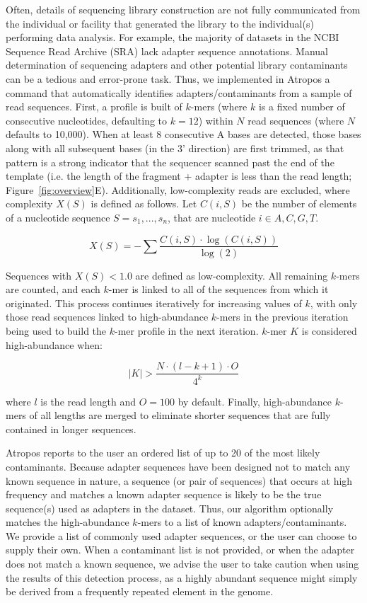 \documentclass[fleqn,10pt,lineno]{wlpeerj} %
\begin{document}
Often, details of sequencing library construction are not fully communicated from the individual or facility that generated the library to the individual(s) performing data analysis. For example, the majority of datasets in the NCBI Sequence Read Archive (SRA) lack adapter sequence annotations. Manual determination of sequencing adapters and other potential library contaminants can be a tedious and error-prone task. Thus, we implemented in Atropos a command that automatically identifies adapters/contaminants from a sample of read sequences. First, a profile is built of $k$-mers (where $k$ is a fixed number of consecutive nucleotides, defaulting to $k=12$) within $N$ read sequences (where $N$ defaults to 10,000). When at least 8 consecutive A bases are detected, those bases along with all subsequent bases (in the 3' direction) are first trimmed, as that pattern is a strong indicator that the sequencer scanned past the end of the template (i.e. the length of the fragment + adapter is less than the read length; Figure~\ref{fig:overview}E). Additionally, low-complexity reads are excluded, where complexity $X(S)$ is defined as follows. Let $C(i,S)$ be the number of elements of a nucleotide sequence $S = s_{1}, ..., s_{n}$, that are nucleotide $i \in {A,C,G,T}$.

\begin{equation}
X(S) = -\sum \frac{C(i,S) \cdot \log(C(i,S))}{\log(2)}
\label{eq:complexity}
\end{equation}

Sequences with $X(S) < 1.0$ are defined as low-complexity. All remaining $k$-mers are counted, and each $k$-mer is linked to all of the sequences from which it originated. This process continues iteratively for increasing values of $k$, with only those read sequences linked to high-abundance $k$-mers in the previous iteration being used to build the $k$-mer profile in the next iteration. $k$-mer $K$ is considered high-abundance when:

\begin{equation}
|K| > \frac{N \cdot (l - k + 1) \cdot O}{4^k}
\label{eq:abundance}
\end{equation}

where $l$ is the read length and $O=100$ by default. Finally, high-abundance $k$-mers of all lengths are merged to eliminate shorter sequences that are fully contained in longer sequences.

Atropos reports to the user an ordered list of up to 20 of the most likely contaminants. Because adapter sequences have been designed not to match any known sequence in nature, a sequence (or pair of sequences) that occurs at high frequency and matches a known adapter sequence is likely to be the true sequence(s) used as adapters in the dataset. Thus, our algorithm optionally matches the high-abundance $k$-mers to a list of known adapters/contaminants. We provide a list of commonly used adapter sequences, or the user can choose to supply their own. When a contaminant list is not provided, or when the adapter does not match a known sequence, we advise the user to take caution when using the results of this detection process, as a highly abundant sequence might simply be derived from a frequently repeated element in the genome.
\end{document}
